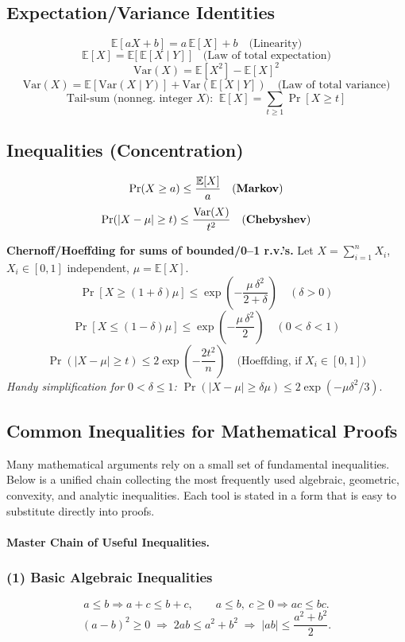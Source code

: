 \documentclass[9pt]{extarticle}
\begin{document}
\subsection{Expectation/Variance Identities}
\[
\mathbb{E}[aX+b]=a\,\mathbb{E}[X]+b\quad\text{(Linearity)}
\]
\[
\mathbb{E}[X]=\mathbb{E}\big[\ \mathbb{E}[X\mid Y]\ \big]\quad\text{(Law of total expectation)}
\]
\[
\mathrm{Var}(X)=\mathbb{E}[X^2]-\mathbb{E}[X]^2
\]
\[
\mathrm{Var}(X)=\mathbb{E}\!\left[\mathrm{Var}(X\mid Y)\right]+\mathrm{Var}\!\left(\mathbb{E}[X\mid Y]\right)\quad\text{(Law of total variance)}
\]
\[
\text{Tail-sum (nonneg. integer $X$): }\ \mathbb{E}[X]=\sum_{t\ge1}\Pr[X\ge t]
\]

\subsection{Inequalities (Concentration)}
\[
\Pr(X\ge a)\le \frac{\mathbb{E}[X]}{a}\quad\text{(\textbf{Markov})}
\]
\[
\Pr(|X-\mu|\ge t)\le \frac{\mathrm{Var}(X)}{t^2}\quad\text{(\textbf{Chebyshev})}
\]

\noindent\textbf{Chernoff/Hoeffding for sums of bounded/0--1 r.v.'s.} Let $X=\sum_{i=1}^n X_i$, $X_i\in[0,1]$ independent, $\mu=\mathbb{E}[X]$.
\[
\Pr\!\left[X\ge (1+\delta)\mu\right]\le \exp\!\left(-\frac{\mu\,\delta^2}{2+\delta}\right)\quad(\delta>0)
\]
\[
\Pr\!\left[X\le (1-\delta)\mu\right]\le \exp\!\left(-\frac{\mu\,\delta^2}{2}\right)\quad(0<\delta<1)
\]
\[
\Pr(|X-\mu|\ge t)\le 2\exp\!\left(-\frac{2t^2}{n}\right)\quad\text{(Hoeffding, if $X_i\in[0,1]$)}
\]
\emph{Handy simplification for $0<\delta\le1$: } $\Pr(|X-\mu|\ge \delta\mu)\le 2\exp(-\mu\delta^2/3)$.
\subsection{Common Inequalities for Mathematical Proofs}
Many mathematical arguments rely on a small set of fundamental inequalities.
Below is a unified chain collecting the most frequently used algebraic,
geometric, convexity, and analytic inequalities.  Each tool is stated in a form
that is easy to substitute directly into proofs.
\paragraph{Master Chain of Useful Inequalities.}

\subsubsection*{(1) Basic Algebraic Inequalities}
\[
a \le b \Rightarrow a+c \le b+c,
\qquad
a \le b,\ c \ge 0 \Rightarrow ac \le bc.
\]
\[
(a-b)^2 \ge 0
\;\Rightarrow\;
2ab \le a^2 + b^2
\;\Rightarrow\;
|ab| \le \frac{a^2 + b^2}{2}.
\]
\end{document}
